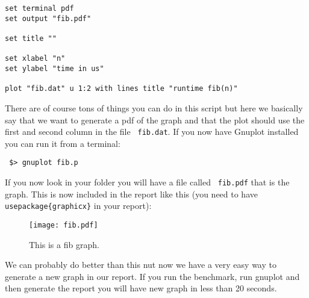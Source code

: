 \documentclass[a4paper,11pt]{article}
\begin{document}
\begin{verbatim}
set terminal pdf
set output "fib.pdf"

set title ""

set xlabel "n"
set ylabel "time in us"

plot "fib.dat" u 1:2 with lines title "runtime fib(n)"
\end{verbatim}

There are of course tons of things you can do in this script but here
we basically say that we want to generate a pdf of the graph and that
the plot should use the first and second column in the file {\tt
  fib.dat}.  If you now have Gnuplot installed you can run it from a terminal:

\begin{verbatim}
 $> gnuplot fib.p
\end{verbatim}

If you now look in your folder you will have a file called {\tt
  fib.pdf} that is the graph. This is now included in the report like
this (you need to have {\tt \\usepackage\{graphicx\}} in your report):

\begin{figure}[H]
  \center
  \texttt{[image: fib.pdf]}
  \caption{This is a fib graph.}
  \label{fig:fib}
\end{figure}

We can probably do better than this nut now we have a very easy way to
generate a new graph in our report. If you run the benchmark, run
gnuplot and then generate the report you will have new graph in less
than 20 seconds.
\end{document}
